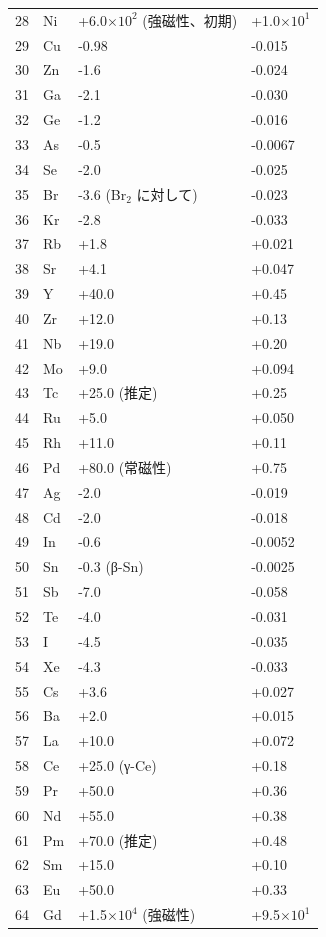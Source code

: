 \documentclass[11pt,a4paper]{article}
\theoremstyle{remark}
\begin{document}
\begin{longtable}{p{0.6cm}p{1.2cm}p{2.5cm}p{2.5cm}}
		28 & Ni & +6.0\(\times10^2\) (強磁性、初期) & +1.0\(\times10^1\) \\
		29 & Cu & -0.98 & -0.015 \\
		30 & Zn & -1.6 & -0.024 \\
		31 & Ga & -2.1 & -0.030 \\
		32 & Ge & -1.2 & -0.016 \\
		33 & As & -0.5 & -0.0067 \\
		34 & Se & -2.0 & -0.025 \\
		35 & Br & -3.6 (Br\(_2\) に対して) & -0.023 \\
		36 & Kr & -2.8 & -0.033 \\
		37 & Rb & +1.8 & +0.021 \\
		38 & Sr & +4.1 & +0.047 \\
		39 & Y  & +40.0 & +0.45 \\
		40 & Zr & +12.0 & +0.13 \\
		41 & Nb & +19.0 & +0.20 \\
		42 & Mo & +9.0 & +0.094 \\
		43 & Tc & +25.0 (推定) & +0.25 \\
		44 & Ru & +5.0 & +0.050 \\
		45 & Rh & +11.0 & +0.11 \\
		46 & Pd & +80.0 (常磁性) & +0.75 \\
		47 & Ag & -2.0 & -0.019 \\
		48 & Cd & -2.0 & -0.018 \\
		49 & In & -0.6 & -0.0052 \\
		50 & Sn & -0.3 (β-Sn) & -0.0025 \\
		51 & Sb & -7.0 & -0.058 \\
		52 & Te & -4.0 & -0.031 \\
		53 & I  & -4.5 & -0.035 \\
		54 & Xe & -4.3 & -0.033 \\
		55 & Cs & +3.6 & +0.027 \\
		56 & Ba & +2.0 & +0.015 \\
		57 & La & +10.0 & +0.072 \\
		58 & Ce & +25.0 (γ-Ce) & +0.18 \\
		59 & Pr & +50.0 & +0.36 \\
		60 & Nd & +55.0 & +0.38 \\
		61 & Pm & +70.0 (推定) & +0.48 \\
		62 & Sm & +15.0 & +0.10 \\
		63 & Eu & +50.0 & +0.33 \\
		64 & Gd & +1.5\(\times10^4\) (強磁性) & +9.5\(\times10^1\) \\

\end{longtable}
\end{document}
